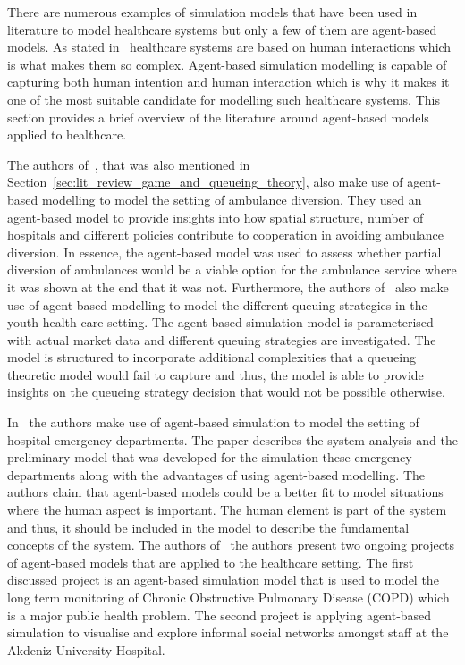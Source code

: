 There are numerous examples of simulation models that have been used in
literature to model healthcare systems but only a few of them are agent-based
models.
As stated in~\cite{EscuderoMarin20111239} healthcare systems are based on human
interactions which is what makes them so complex.
Agent-based simulation modelling is capable of capturing both human intention
and human interaction which is why it makes it one of the most suitable
candidate for modelling such healthcare systems.
This section provides a brief overview of the literature around agent-based
models applied to healthcare.

The authors of~\cite{hagtvedt2009cooperative}, that was also mentioned in
Section~\ref{sec:lit_review_game_and_queueing_theory}, also make use of
agent-based modelling to model the setting of ambulance diversion. 
They used an agent-based model to provide insights into how spatial structure,
number of hospitals and different policies contribute to cooperation in
avoiding ambulance diversion.
In essence, the agent-based model was used to assess whether partial diversion
of ambulances would be a viable option for the ambulance service where it
was shown at the end that it was not.
Furthermore, the authors of~\cite{Giesen2009} also make use of agent-based
modelling to model the different queuing strategies in the youth health care
setting.
The agent-based simulation model is parameterised with actual market data and
different queuing strategies are investigated.
The model is structured to incorporate additional complexities that a queueing
theoretic model would fail to capture and thus, the model is able to provide
insights on the queueing strategy decision that would not be possible
otherwise.

In~\cite{Stainsby2009536} the authors make use of agent-based simulation to
model the setting of hospital emergency departments.
The paper describes the system analysis and the preliminary model that was
developed for the simulation these emergency departments along with the
advantages of using agent-based modelling.
The authors claim that agent-based models could be a better fit to model
situations where the human aspect is important.
The human element is part of the system and thus, it should be included in the
model to describe the fundamental concepts of the system.
The authors of~\cite{Bilge2006699} the authors present two ongoing projects of
agent-based models that are applied to the healthcare setting.
The first discussed project is an agent-based simulation model that is used to
model the long term monitoring of Chronic Obstructive Pulmonary Disease (COPD)
which is a major public health problem.
The second project is applying agent-based simulation to visualise and explore
informal social networks amongst staff at the Akdeniz University Hospital.




